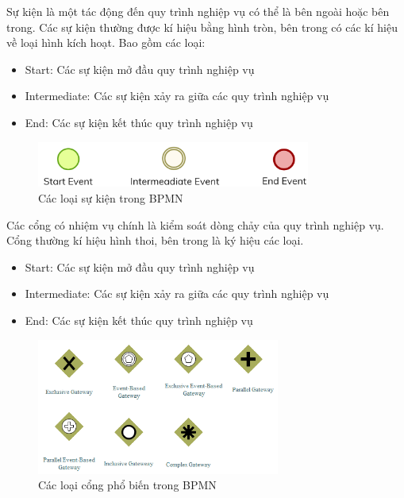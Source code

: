Sự kiện là một tác động đến quy trình nghiệp vụ có thể là bên ngoài hoặc bên trong. Các sự kiện thường được kí hiệu bằng hình tròn, bên trong có các kí hiệu về loại hình kích hoạt. Bao gồm các loại:
\begin{itemize}
    \item Start: Các sự kiện mở đầu quy trình nghiệp vụ
    \item Intermediate: Các sự kiện xảy ra giữa các quy trình nghiệp vụ
    \item End: Các sự kiện kết thúc quy trình nghiệp vụ
\end{itemize}
\begin{figure}[!htp]
    \begin{center}
        \includegraphics[width=9cm]{img/theory/BPMN/Event.png}
    \end{center}
    \caption{Các loại sự kiện trong BPMN \cite{theoryBPMN1}}
\end{figure}


Các cổng có nhiệm vụ chính là kiểm soát dòng chảy của quy trình nghiệp vụ. Cổng thường kí hiệu hình thoi, bên trong là ký hiệu các loại.
\begin{itemize}
    \item Start: Các sự kiện mở đầu quy trình nghiệp vụ
    \item Intermediate: Các sự kiện xảy ra giữa các quy trình nghiệp vụ
    \item End: Các sự kiện kết thúc quy trình nghiệp vụ
\end{itemize}
\begin{figure}[!htp]
    \begin{center}
        \includegraphics[width=8cm]{img/theory/BPMN/Gateway.png}
    \end{center}
    \caption{Các loại cổng phổ biến trong BPMN \cite{theoryBPMN1}}
\end{figure}



